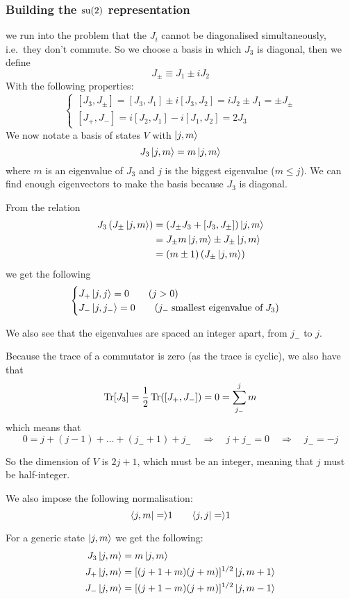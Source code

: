 \subsubsection{Building the $\operatorname{su}(2)$ representation} we run into the problem that the $J_i$ cannot be diagonalised simultaneously, i.e.\ they don't commute.
So we choose a basis in which $J_3$ is diagonal, then we define
\[ J_\pm \equiv J_1 \pm iJ_2 \]
With the following properties:
\[ \begin{cases}
[J_3,J_\pm] = [J_3,J_1]\pm i[J_3,J_2] = iJ_2 \pm J_1 = \pm J_\pm \\
[J_+, J_-] = i[J_2,J_1] - i[J_1,J_2] = 2J_3
\end{cases} \]
We now notate a basis of states $V$ with $\left| j,m \right\rangle$
\[ J_3\left| j,m \right\rangle = m\left| j,m \right\rangle \]
where $m$ is an eigenvalue of $J_3$ and $j$ is the biggest eigenvalue ($m\leq j$). We can find enough eigenvectors to make the basis because $J_3$ is diagonal.

From the relation 
\begin{align}
J_3 \left(J_\pm\left| j,m \right\rangle\right) &= \left(J_\pm J_3 + [J_3,J_\pm]\right)\left| j,m \right\rangle \\
&= J_\pm m \left| j,m \right\rangle \pm J_\pm \left| j,m \right\rangle \\
&= (m\pm 1)\left(J_\pm\left| j,m \right\rangle\right)
\end{align}
we get the following
\[ \begin{cases}
J_+\left| j,j \right\rangle = 0 \qquad (j>0) \\
J_-\left| j,j_- \right\rangle = 0 \qquad (j_- \;\text{smallest eigenvalue of}\; J_3)
\end{cases} \]

We also see that the eigenvalues are spaced an integer apart, from $j_-$ to $j$.


Because the trace of a commutator is zero (as the trace is cyclic), we also have that 
\[ \operatorname{Tr}[J_3] = \frac{1}{2}\operatorname{Tr}([J_+,J_-]) = 0 = \sum_{j_-}^j m \]
which means that
\[ 0 = j + (j-1) + \ldots + (j_-+1) +j_- \quad \Rightarrow \quad j+j_- = 0 \quad \Rightarrow \quad j_- = -j \]

So the dimension of $V$ is $2j+1$, which must be an integer, meaning that $j$ must be half-integer.

We also impose the following normalisation:
\[ \braket{j,m} = 1 \qquad \braket{j,j} = 1\]

For a generic state $\left| j,m \right\rangle$ we get the following:
\begin{align}
J_3\left| j,m \right\rangle &= m\left| j,m \right\rangle \\
J_+\left| j,m \right\rangle &= [(j+1+m)(j+m)]^{1/2} \left| j,m+1 \right\rangle \\
J_-\left| j,m \right\rangle &= [(j+1-m)(j+m)]^{1/2} \left| j,m-1 \right\rangle
\end{align}

